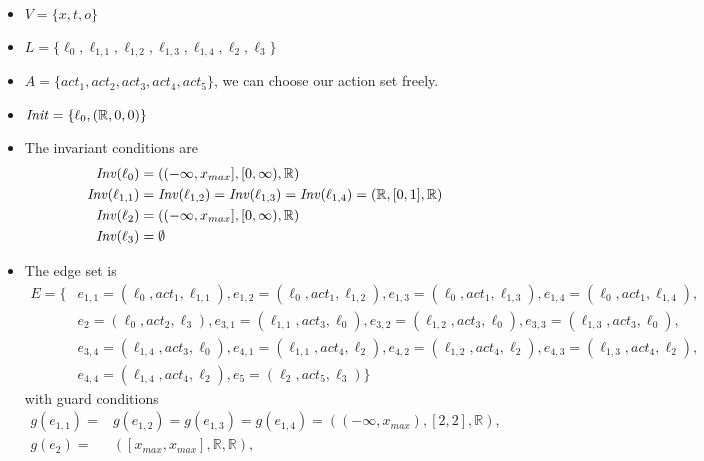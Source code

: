 \begin{ex}
\begin{itemize}
    \item $V=\{x,t,o\}$
    \item $L=\{\ell_{0},\ell_{1,1},\ell_{1,2},\ell_{1,3},\ell_{1,4},\ell_{2},\ell_{3}\}$
    \item $A=\{act_{1},act_{2},act_{3},act_{4},act_{5}\}$, we can choose our action set freely.
    \item $\mathit{Init} = \{\ell_{0},(\mathbb{R},0,0)\}$
    \item The invariant conditions are
        \begin{align*}
            \mathit{Inv}(\ell_{0})&=((-\infty,x_{max}],[0,\infty),\mathbb{R}) \\
            \mathit{Inv}(\ell_{1,1})&=\mathit{Inv}(\ell_{1,2})=\mathit{Inv}(\ell_{1,3})=\mathit{Inv}(\ell_{1,4})=(\mathbb{R},[0,1],\mathbb{R}) \\
            \mathit{Inv}(\ell_{2})&=((-\infty,x_{max}],[0,\infty),\mathbb{R}) \\
            \mathit{Inv}(\ell_{3})&=\emptyset
        \end{align*}
    \item The edge set is
    \begin{align*}
        E=\{&e_{1,1}=(\ell_{0},act_{1},\ell_{1,1}),
        e_{1,2}=(\ell_{0},act_{1},\ell_{1,2}), e_{1,3}=(\ell_{0},act_{1},\ell_{1,3}),
        e_{1,4}=(\ell_{0},act_{1},\ell_{1,4}), \\
        & e_{2}=(\ell_{0},act_{2},\ell_{3}), e_{3,1}=(\ell_{1,1},act_{3},\ell_{0}), e_{3,2}=(\ell_{1,2},act_{3},\ell_{0}), e_{3,3}=(\ell_{1,3},act_{3},\ell_{0}), \\
        & e_{3,4}=(\ell_{1,4},act_{3},\ell_{0}), e_{4,1}=(\ell_{1,1},act_{4},\ell_{2}), e_{4,2}=(\ell_{1,2},act_{4},\ell_{2}), e_{4,3}=(\ell_{1,3},act_{4},\ell_{2}), \\
        & e_{4,4}=(\ell_{1,4},act_{4},\ell_{2}), e_{5}=(\ell_{2},act_{5},\ell_{3})\}
    \end{align*}
        with guard conditions
        \begin{align*}
            g(e_{1,1})=&g(e_{1,2})=g(e_{1,3})=g(e_{1,4})=((-\infty,x_{max}),[2,2],\mathbb{R}), \\
            g(e_{2})=&([x_{max},x_{max}],\mathbb{R},\mathbb{R}), \\

\end{align*}
\end{itemize}
\end{ex}
